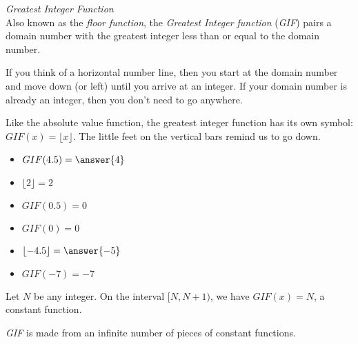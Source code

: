 \documentclass{ximera}
\begin{document}
\begin{example} \textit{Greatest Integer Function} \\
Also known as the \textit{floor function}, the \textit{Greatest Integer function} (\textit{GIF}) pairs a domain number with the greatest integer less than or equal to the domain number.

If you think of a horizontal number line, then you start at the domain number and move down (or left) until you arrive at an integer.  If your domain number is already an integer, then you don't need to go anywhere.


Like the absolute value function, the greatest integer function has its own symbol:  $GIF(x) = \lfloor x \rfloor$. The little feet on the vertical bars remind us to go down.

\begin{itemize}
\item $GIF(4.5) = \answer{4}$
\item $\lfloor 2 \rfloor = 2$
\item $GIF(0.5) = 0$
\item $GIF(0) = 0$
\item $\lfloor -4.5 \rfloor = \answer{-5}$
\item $GIF(-7) = -7$
\end{itemize}




Let $N$ be any integer. On the interval $[N, N+1)$, we have $GIF(x) = N$, a constant function.

\textit{GIF} is made from an infinite number of pieces of constant functions.







\end{example}
\end{document}
